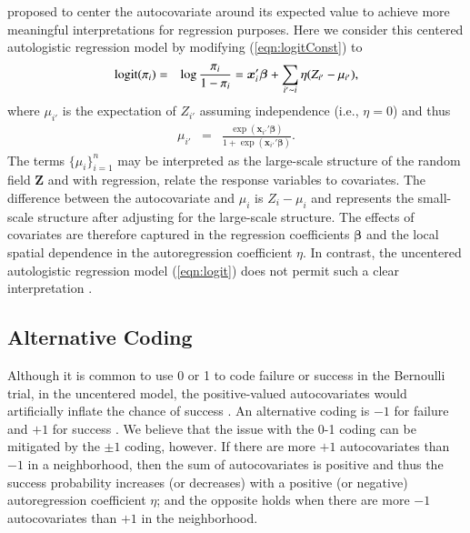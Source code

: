 \documentclass[authoryear,review, 12pt]{elsarticle}
\begin{document}
\cite{carageak09} proposed to center the autocovariate around its expected value to achieve more meaningful interpretations for regression purposes.  Here we consider this centered autologistic regression model by modifying (\ref{eqn:logitConst}) to
\begin{eqnarray}
\mbox{logit}(\pi_i)&=&\log\frac{\pi_i}{1-\pi_i}=\bm{x}'_i\bm{\beta}+\sum_{i'\thicksim i}\eta(Z_{i'}-\mu_{i'}),
\label{eqn:logitCenter}
\end{eqnarray}
where $\mu_{i'}$ is the expectation of $Z_{i'}$ assuming independence (i.e., $\eta=0$) and thus
\begin{eqnarray}
\mu_{i'}&=&\frac{\exp(\bm{x}_{i'}'\bm{\beta})}{1+\exp(\bm{x}_{i'}'\bm{\beta})}.
\end{eqnarray}     
The terms $\{\mu_i\}_{i=1}^n$ may be interpreted as the large-scale structure of the random field $\bm{Z}$ and with regression, relate the response variables to covariates.  The difference between the autocovariate and $\mu_i$ is $Z_i-\mu_i$ and represents the small-scale structure after adjusting for the large-scale structure.  The effects of covariates are therefore captured in the regression coefficients $\bm{\beta}$ and the local spatial dependence in the autoregression coefficient $\eta$.  In contrast, the uncentered autologistic regression model (\ref{eqn:logit}) does not permit such a clear interpretation \citep{carageak09}.

\subsection{Alternative Coding}
\label{subsec:model:code}

Although it is common to use 0 or 1 to code failure or success in the Bernoulli trial, in the uncentered model, the positive-valued autocovariates would artificially inflate the chance of success \citep{hughesh11}.  An alternative coding is $-1$ for failure and $+1$ for success \citep{gaetang10}. We believe that the issue with the 0-1 coding can be mitigated by the $\pm 1$ coding, however.  If there are more $+1$ autocovariates than $-1$ in a neighborhood, then the sum of autocovariates is positive and thus the success probability increases (or decreases) with a positive (or negative) autoregression coefficient $\eta$; and the opposite holds when there are more $-1$ autocovariates than $+1$ in the neighborhood. 
\end{document}
